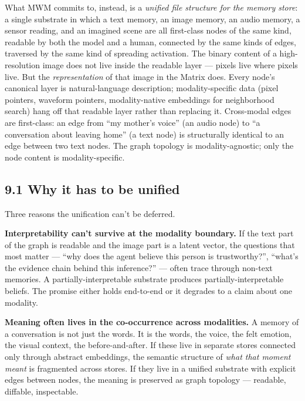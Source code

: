 \documentclass[12pt]{article}
\begin{document}
What MWM commits to, instead, is a \emph{unified file structure for the memory store}: a single substrate in which a text memory, an image memory, an audio memory, a sensor reading, and an imagined scene are all first-class nodes of the same kind, readable by both the model and a human, connected by the same kinds of edges, traversed by the same kind of spreading activation. The binary content of a high-resolution image does not live inside the readable layer --- pixels live where pixels live. But the \emph{representation} of that image in the Matrix does. Every node's canonical layer is natural-language description; modality-specific data (pixel pointers, waveform pointers, modality-native embeddings for neighborhood search) hang off that readable layer rather than replacing it. Cross-modal edges are first-class: an edge from ``my mother's voice'' (an audio node) to ``a conversation about leaving home'' (a text node) is structurally identical to an edge between two text nodes. The graph topology is modality-agnostic; only the node content is modality-specific.

\subsection{9.1 Why it has to be unified}\label{why-it-has-to-be-unified}

Three reasons the unification can't be deferred.

\textbf{Interpretability can't survive at the modality boundary.} If the text part of the graph is readable and the image part is a latent vector, the questions that most matter --- ``why does the agent believe this person is trustworthy?'', ``what's the evidence chain behind this inference?'' --- often trace through non-text memories. A partially-interpretable substrate produces partially-interpretable beliefs. The promise either holds end-to-end or it degrades to a claim about one modality.

\textbf{Meaning often lives in the co-occurrence across modalities.} A memory of a conversation is not just the words. It is the words, the voice, the felt emotion, the visual context, the before-and-after. If these live in separate stores connected only through abstract embeddings, the semantic structure of \emph{what that moment meant} is fragmented across stores. If they live in a unified substrate with explicit edges between nodes, the meaning is preserved as graph topology --- readable, diffable, inspectable.
\end{document}
